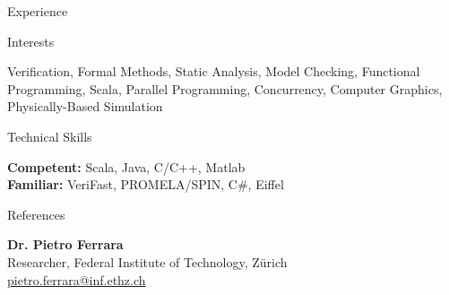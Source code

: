 \documentclass[margin]{res}
\begin{document}
\begin{resume}
\begin{section}{Experience}
	\end{section}


	\begin{section}{Interests}

		Verification, Formal Methods, Static Analysis, Model Checking, Functional Programming, Scala,
		Parallel Programming, Concurrency, Computer Graphics, Physically-Based Simulation

	\end{section}


	\begin{section}{Technical Skills}

		\textbf{Competent:} Scala, Java, C/C++, Matlab\\
		\textbf{Familiar:} VeriFast, PROMELA/SPIN, C\#, Eiffel

	\end{section}


	\begin{section}{References}

		\textbf{Dr. Pietro Ferrara}\\ 
		Researcher, Federal Institute of Technology, Z\"urich\\[2pt]
		\url{pietro.ferrara@inf.ethz.ch}\\

	\end{section}

\end{resume} 
\end{document}

